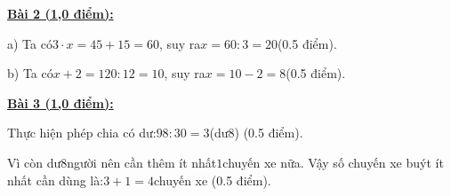\documentclass[11pt,a4paper]{article}
\begin{document}
\noindent\textbf{\underline{Bài 2 (1,0 điểm):}}\par\vspace{3pt}
a) Ta có$3 \cdot x = 45 + 15 = 60$, suy ra$x = 60 : 3 = 20$(0.5 điểm).\par\noindent b) Ta có$x + 2 = 120 : 12 = 10$, suy ra$x = 10 - 2 = 8$(0.5 điểm).\par\vspace{8pt}

\noindent\textbf{\underline{Bài 3 (1,0 điểm):}}\par\vspace{3pt}
Thực hiện phép chia có dư:$98 : 30 = 3$(dư$8$) (0.5 điểm).\par\noindent Vì còn dư$8$người nên cần thêm ít nhất$1$chuyến xe nữa. Vậy số chuyến xe buýt ít nhất cần dùng là:$3 + 1 = 4$chuyến xe (0.5 điểm).\par\vspace{8pt}
\end{document}
